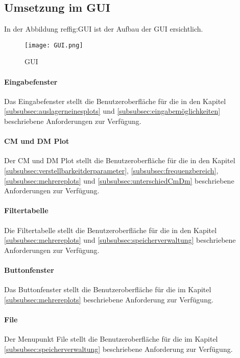 
\subsection{Umsetzung im GUI}\label{subsec:umsetzungimgui}
In der Abbildung ref{fig:GUI} ist der Aufbau der GUI ersichtlich.

\begin{figure}[H]
	\centering
	\texttt{[image: GUI.png]}
	\caption{GUI}
	\label{fig:GUI}
\end{figure}

\paragraph{Eingabefenster}
Das Eingabefenster stellt die Benutzeroberfläche für die in den Kapitel \ref{subsubsec:auslagerneinesplots} und \ref{subsubsec:eingabemöglichkeiten} beschriebene Anforderungen zur Verfügung.

\paragraph{CM und DM Plot}
Der CM und DM Plot stellt die Benutzeroberfläche für die in den Kapitel \ref{subsubsec:verstellbarkeitderparameter}, \ref{subsubsec:frequenzbereich}, \ref{subsubsec:mehrereplots} und \ref{subsubsec:unterschiedCmDm} beschriebene Anforderungen zur Verfügung.

\paragraph{Filtertabelle}
Die Filtertabelle stellt die Benutzeroberfläche für die in den Kapitel \ref{subsubsec:mehrereplots} und \ref{subsubsec:speicherverwaltung} beschriebene Anforderungen zur Verfügung.

\paragraph{Buttonfenster}
Das Buttonfenster stellt die Benutzeroberfläche für die im Kapitel \ref{subsubsec:mehrereplots} beschriebene Anforderung zur Verfügung.

\paragraph{File}
Der Menupunkt File stellt die Benutzeroberfläche für die im Kapitel \ref{subsubsec:speicherverwaltung} beschriebene Anforderung zur Verfügung.

